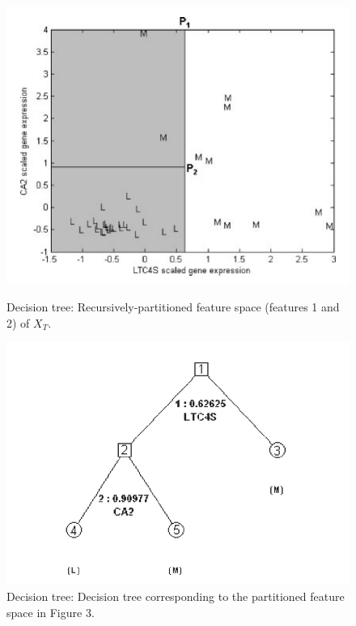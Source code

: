 \documentclass[a4paper]{article}
\begin{document}
\begin{figure}[H]
    \centering
    \begin{minipage}{0.48\textwidth}
      \centering
      \includegraphics[width=\linewidth]{./images/Decision tree-Recursively-partitioned feature space.png}
      \caption{Decision tree: Recursively-partitioned feature space (features 1 and 2) of $X_T$.}
      \label{fig.Decision tree-data[An introduction to decision tree modeling]}
    \end{minipage}\hfill
    \begin{minipage}{0.48\textwidth}
      \centering
      \includegraphics[width=\linewidth]{./images/Decision tree.png}
      \caption{Decision tree: Decision tree corresponding to the partitioned feature space in Figure 3.}
      \label{fig.Decision tree[An introduction to decision tree modeling]}
    \end{minipage}
\end{figure}
\end{document}
